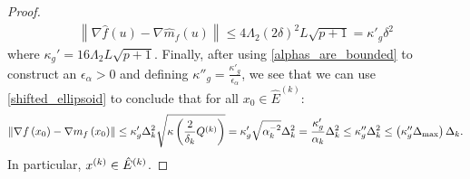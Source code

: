 \begin{proof}
\begin{align*}
\left\|\nabla \hat {f}\left(u\right) - \nabla \hat{m}_f\left(u\right) \right\|\le 4 \Lambda_2 \left(2\delta\right)^2 L \sqrt{p+1} = {\kappa'}_g\delta^2
\end{align*}
where $\kappa_{g}' = 16 \Lambda_2 L \sqrt{p+1}$.
Finally, after using  \cref{alphas_are_bounded} to construct an $\epsilon_{\alpha} > 0$ and defining $\kappa''_{g} =  \frac{\kappa'_g}{\epsilon_{\alpha}}$, we see that
we can use  \cref{shifted_ellipsoid} to conclude that for all $x_0 \in \hat E^{(k)}$:
\begin{align*}
\left\|\nabla f\left(x_0 \right) - \nabla m_f\left(x_0\right)\right\| \le 
\kappa'_g  \Delta_k^2 \sqrt{\kappa\left(\frac 2 {\delta_k} Q^{(k)}\right)}=  \kappa'_g \sqrt{\alpha_k^{-2}}\Delta_k^2 = \frac{\kappa'_g}{\alpha_k} \Delta_k^2\le \kappa''_g\Delta_k^2 \le \left(\kappa''_g \Delta_{\text{max}}\right) \Delta_k.
\end{align*}
In particular, ${x^{(k)}} \in \hat E^{(k)}$.
\end{proof}




% 

